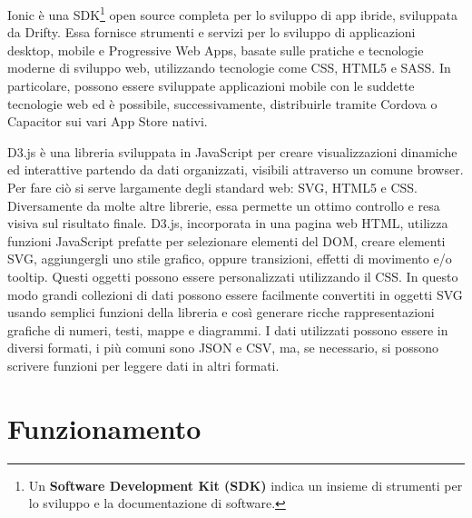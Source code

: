 Ionic \`{e} una SDK\footnote{Un \textbf{Software Development Kit (SDK)} indica un insieme di strumenti per lo sviluppo e la documentazione di software.} open source completa per lo sviluppo di app ibride, sviluppata da Drifty. Essa fornisce strumenti e servizi per lo sviluppo di applicazioni desktop, mobile e Progressive Web Apps, basate sulle pratiche e tecnologie moderne di sviluppo web, utilizzando tecnologie come CSS, HTML5 e SASS. In particolare, possono essere sviluppate applicazioni mobile con le suddette tecnologie web ed \`{e} possibile, successivamente, distribuirle tramite Cordova o Capacitor sui vari App Store nativi.\par
D3.js \`{e} una libreria sviluppata in JavaScript per creare visualizzazioni dinamiche ed interattive partendo da dati organizzati, visibili attraverso un comune browser. Per fare ci\`{o} si serve largamente degli standard web: SVG, HTML5 e CSS. Diversamente da molte altre librerie, essa permette un ottimo controllo e resa visiva sul risultato finale. D3.js, incorporata in una pagina web HTML, utilizza funzioni JavaScript prefatte per selezionare elementi del DOM, creare elementi SVG, aggiungergli uno stile grafico, oppure transizioni, effetti di movimento e/o tooltip. Questi oggetti possono essere personalizzati utilizzando il CSS. In questo modo grandi collezioni di dati possono essere facilmente convertiti in oggetti SVG usando semplici funzioni della libreria e cos\`{i} generare ricche rappresentazioni grafiche di numeri, testi, mappe e diagrammi. I dati utilizzati possono essere in diversi formati, i pi\`{u} comuni sono JSON e CSV, ma, se necessario, si possono scrivere funzioni per leggere dati in altri formati.

\section{Funzionamento}

